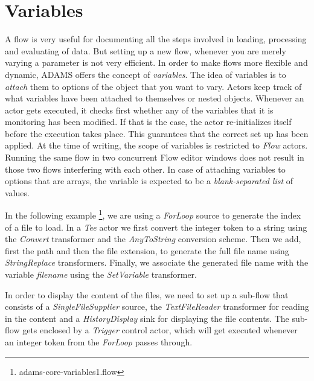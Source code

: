 \newpage
\section{Variables}
\label{variables}
A flow is very useful for documenting all the steps involved in loading,
processing and evaluating of data. But setting up a new flow, whenever you are
merely varying a parameter is not very efficient. In order to make flows more
flexible and dynamic, ADAMS offers the concept of \textit{variables}. The
idea of variables is to \textit{attach} them to options of the object that you
want to vary. Actors keep track of what variables have been attached to
themselves or nested objects. Whenever an actor gets executed, it checks first
whether any of the variables that it is monitoring has been modified. If that is
the case, the actor re-initializes itself before the execution takes place. This
guarantees that the correct set up has been applied. At the time of writing,
the scope of variables is restricted to \textit{Flow} actors. Running the same
flow in two concurrent Flow editor windows does not result in those two flows interfering
with each other. In case of attaching variables to options that are arrays,
the variable is expected to be a \textit{blank-separated list} of values.

In the following example \footnote{adams-core-variables1.flow}, we are using a
\textit{ForLoop} source to generate the index of a file to load. In a
\textit{Tee} actor we first convert the integer token to a string using the
\textit{Convert} transformer and the \textit{AnyToString} conversion scheme.
Then we add, first the path and then the file extension, to generate the full
file name using \textit{StringReplace} transformers. Finally, we associate
the generated file name with the variable \textit{filename} using the
\textit{SetVariable} transformer.

In order to display the content of the files, we need to set up a sub-flow that
consists of a \textit{SingleFileSupplier} source, the \textit{TextFileReader}
transformer for reading in the content and a \textit{HistoryDisplay} sink for
displaying the file contents. The sub-flow gets enclosed by a \textit{Trigger}
control actor, which will get executed whenever an integer token from the
\textit{ForLoop} passes through.

